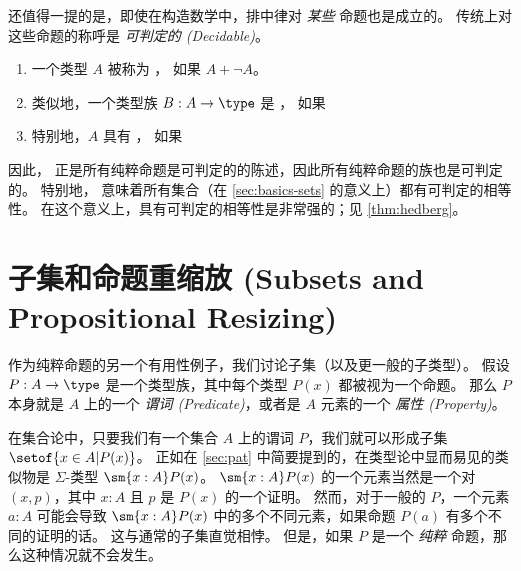 还值得一提的是，即使在构造数学中，排中律对 \emph{某些} 命题也是成立的。
传统上对这些命题的称呼是 \emph{可判定的 (Decidable)}。

\begin{defn}\label{defn:decidable-equality}
\mbox{}
\begin{enumerate}
  \item 一个类型 $A$ 被称为 ，
  如果 $A+\neg A$。
  \item 类似地，一个类型族 $B:A\to \type$ 是 ，
  如果  \label{item:decidable-equality2}
  \item 特别地，$A$ 具有 ，
  如果 
\end{enumerate}
\end{defn}

因此，\LEM{} 正是所有纯粹命题是可判定的的陈述，因此所有纯粹命题的族也是可判定的。
特别地，\LEM{} 意味着所有集合（在 \cref{sec:basics-sets} 的意义上）都有可判定的相等性。
在这个意义上，具有可判定的相等性是非常强的；见 \cref{thm:hedberg}。

%
%

\section{子集和命题重缩放 (Subsets and Propositional Resizing)}
\label{subsec:prop-subsets}

%

作为纯粹命题的另一个有用性例子，我们讨论子集（以及更一般的子类型）。
假设 $P:A\to\type$ 是一个类型族，其中每个类型 $P(x)$ 都被视为一个命题。
那么 $P$ 本身就是 $A$ 上的一个 \emph{谓词 (Predicate)}，或者是 $A$ 元素的一个 \emph{属性 (Property)}。

在集合论中，只要我们有一个集合 $A$ 上的谓词 $P$，我们就可以形成子集 $\setof{x\in A | P(x)}$。
正如在 \cref{sec:pat} 中简要提到的，在类型论中显而易见的类似物是 $\Sigma$-类型 $\sm{x:A} P(x)$。
$\sm{x:A} P(x)$ 的一个元素当然是一个对 $(x,p)$，其中 $x:A$ 且 $p$ 是 $P(x)$ 的一个证明。
然而，对于一般的 $P$，一个元素 $a:A$ 可能会导致 $\sm{x:A} P(x)$ 中的多个不同元素，如果命题 $P(a)$ 有多个不同的证明的话。
这与通常的子集直觉相悖。
但是，如果 $P$ 是一个 \emph{纯粹} 命题，那么这种情况就不会发生。

